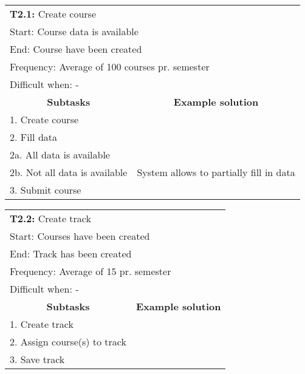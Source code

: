 \begin{tabular}{|p{6cm}|p{6cm}|}
\hline 
	\multicolumn{2}{|l|}{\textbf{T2.1:} \hspace{26mm}Create course} \\
	\multicolumn{2}{|l|}{Start: \hspace{26mm}Course data is available} \\
	\multicolumn{2}{|l|}{End: \hspace{28mm}Course have been created} \\
	\multicolumn{2}{|l|}{Frequency: \hspace{17mm}Average of 100 courses pr. semester} \\
	\multicolumn{2}{|l|}{Difficult when: \hspace{10mm} - } \\ \hline
	\multicolumn{1}{|c|}{\textbf{Subtasks}} & \multicolumn{1}{c|}{\textbf{Example solution}} \\ \hline
	1.  Create course & \\ \hline
	2.  Fill data & \\
	2a. All data is available & \\
	2b. Not all data is available & System allows to partially fill in data \\ \hline
	3.  Submit course & \\ \hline
\end{tabular}
\newline
\vspace{1cm}
\newline
\begin{tabular}{|p{6cm}|p{6cm}|}
\hline 
	\multicolumn{2}{|l|}{\textbf{T2.2:} \hspace{26mm}Create track} \\
	\multicolumn{2}{|l|}{Start: \hspace{26mm}Courses have been created} \\
	\multicolumn{2}{|l|}{End: \hspace{28mm}Track has been created} \\
	\multicolumn{2}{|l|}{Frequency: \hspace{17mm}Average of 15 pr. semester} \\
	\multicolumn{2}{|l|}{Difficult when: \hspace{10mm} - } \\ \hline
	\multicolumn{1}{|c|}{\textbf{Subtasks}} & \multicolumn{1}{c|}{\textbf{Example solution}} \\ \hline
	1.  Create track & \\ \hline
	2.  Assign course(s) to track & \\ \hline
	3.  Save track & \\ \hline
\end{tabular}
